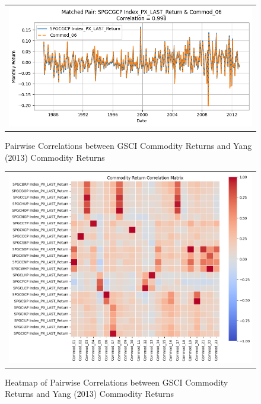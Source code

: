 \documentclass{article}
\begin{document}
\begin{appendices}
\begin{figure}[H]
  \centering
  \begin{tabular}{@{}c@{}}
    \includegraphics[width=\linewidth]{../docs_src/commod_return_comparison.png} \\[\abovecaptionskip]
  \end{tabular}
  \caption{Pairwise Correlations between GSCI Commodity Returns and Yang (2013) Commodity Returns}
  \label{fig:commod_return_comparison}
\end{figure}

\begin{figure}[H]
  \centering
  \begin{tabular}{@{}c@{}}
    \includegraphics[width=\linewidth]{../docs_src/commod_heatmap.png} \\[\abovecaptionskip]
  \end{tabular}
  \caption{Heatmap of Pairwise Correlations between GSCI Commodity Returns and Yang (2013) Commodity Returns}
  \label{fig:commod_heatmap}
\end{figure}



\end{appendices}
\end{document}
